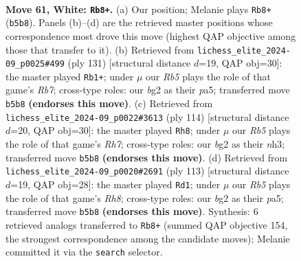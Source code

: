 \documentclass[11pt]{article}
\begin{document}
\clearpage

\begin{figure}[p]\centering
\begin{subfigure}{0.46\textwidth}\centering
\resizebox{\linewidth}{!}{%
\newchessgame
\chessboard[
  setfen={5k2/8/6p1/1R6/1P6/R7/1r4b1/6K1 w - - 0 61},
  showmover=false,
  pgfstyle=straightmove, color=movearrow, markmove={b5-b8}
]}
\caption{}
\end{subfigure}\hfill
\begin{subfigure}{0.46\textwidth}\centering
\resizebox{\linewidth}{!}{%
\newchessgame
\chessboard[
  setfen={8/8/8/PR6/8/1p2k3/1r6/5K2 b - - 0 66},
  showmover=false,
  pgfstyle=straightmove, color=movearrow, markmove={b2-b1}
]}
\caption{}
\end{subfigure}
\\[4pt]
\begin{subfigure}{0.46\textwidth}\centering
\resizebox{\linewidth}{!}{%
\newchessgame
\chessboard[
  setfen={8/7R/3k3P/8/7r/4K2n/8/8 w - - 1 58},
  showmover=false,
  pgfstyle=straightmove, color=movearrow, markmove={h7-h8}
]}
\caption{}
\end{subfigure}\hfill
\begin{subfigure}{0.46\textwidth}\centering
\resizebox{\linewidth}{!}{%
\newchessgame
\chessboard[
  setfen={8/8/8/P7/7R/3k4/1K5p/7r b - - 3 57},
  showmover=false,
  pgfstyle=straightmove, color=movearrow, markmove={h1-d1}
]}
\caption{}
\end{subfigure}
\caption{\textbf{Move 61, White: \texttt{Rb8+}.} (a) Our position; Melanie plays \texttt{Rb8+} (\texttt{b5b8}). Panels (b)--(d) are the retrieved master positions whose correspondence most drove this move (highest QAP objective among those that transfer to it). (b) Retrieved from \texttt{lichess\_elite\_2024-09\_p0025\#499} (ply 131) [structural distance $d$=19, QAP obj=30]: the master played \texttt{Rb1+}; under $\mu$ our \emph{Rb5} plays the role of that game's \emph{Rb7}; cross-type roles: our \emph{b}g2 as their \emph{p}a5; transferred move \texttt{b5b8} \textbf{(endorses this move)}. (c) Retrieved from \texttt{lichess\_elite\_2024-09\_p0022\#3613} (ply 114) [structural distance $d$=20, QAP obj=30]: the master played \texttt{Rh8}; under $\mu$ our \emph{Rb5} plays the role of that game's \emph{Rh7}; cross-type roles: our \emph{b}g2 as their \emph{n}h3; transferred move \texttt{b5b8} \textbf{(endorses this move)}. (d) Retrieved from \texttt{lichess\_elite\_2024-09\_p0020\#2691} (ply 113) [structural distance $d$=19, QAP obj=28]: the master played \texttt{Rd1}; under $\mu$ our \emph{Rb5} plays the role of that game's \emph{Rh8}; cross-type roles: our \emph{b}g2 as their \emph{p}a5; transferred move \texttt{b5b8} \textbf{(endorses this move)}. Synthesis: 6 retrieved analogs transferred to \texttt{Rb8+} (summed QAP objective 154, the strongest correspondence among the candidate moves); Melanie committed it via the \texttt{search} selector.}
\label{fig:thought-m120}
\end{figure}
\end{document}
